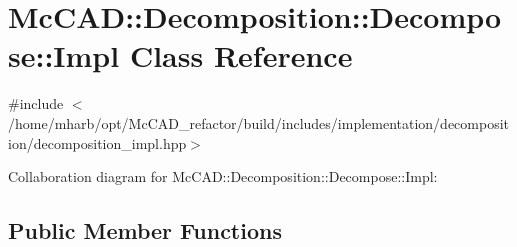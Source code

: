 \hypertarget{classMcCAD_1_1Decomposition_1_1Decompose_1_1Impl}{}\section{Mc\+C\+AD\+:\+:Decomposition\+:\+:Decompose\+:\+:Impl Class Reference}
\label{classMcCAD_1_1Decomposition_1_1Decompose_1_1Impl}


{\ttfamily \#include $<$/home/mharb/opt/\+Mc\+C\+A\+D\+\_\+refactor/build/includes/implementation/decomposition/decomposition\+\_\+impl.\+hpp$>$}



Collaboration diagram for Mc\+C\+AD\+:\+:Decomposition\+:\+:Decompose\+:\+:Impl\+:
\subsection*{Public Member Functions}
